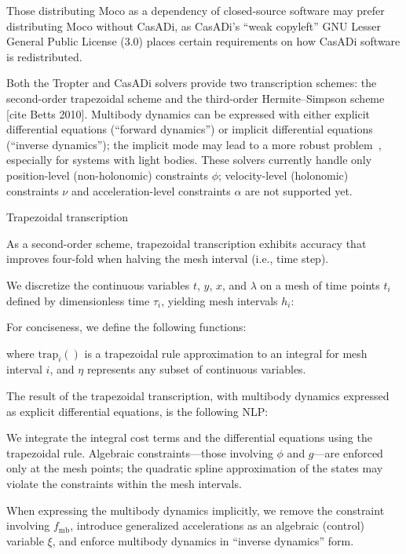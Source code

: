 \documentclass[10pt,letterpaper]{article}
\begin{document}
Those distributing Moco as a dependency of closed-source software may prefer distributing Moco without CasADi, as CasADi’s “weak copyleft” GNU Lesser General Public License (3.0) places certain requirements on how CasADi software is redistributed.

Both the Tropter and CasADi solvers provide two transcription schemes: the second-order trapezoidal scheme and the third-order Hermite–Simpson scheme [cite Betts 2010]. Multibody dynamics can be expressed with either explicit differential equations (“forward dynamics”) or implicit differential equations (“inverse dynamics”); the implicit mode may lead to a more robust problem~\cite{vandenBogert:2011fv}, especially for systems with light bodies. These solvers currently handle only position-level (non-holonomic) constraints $\phi$; velocity-level (holonomic) constraints $\nu$ and acceleration-level constraints $\alpha$ are not supported yet.

Trapezoidal transcription

As a second-order scheme, trapezoidal transcription exhibits accuracy that improves four-fold when halving the mesh interval (i.e., time step).

We discretize the continuous variables $t$, $y$, $x$, and $\lambda$ on a mesh of time points $t_i$ defined by dimensionless time $\tau_i$, yielding mesh intervals $h_i$:



For conciseness, we define the following functions:


where $\mathrm{trap}_i()$ is a trapezoidal rule approximation to an integral for mesh interval $i$, and $\eta$ represents any subset of continuous variables.

The result of the trapezoidal transcription, with multibody dynamics expressed as explicit differential equations, is the following NLP:



We integrate the integral cost terms and the differential equations using the trapezoidal rule. Algebraic constraints—those involving $\phi$ and $g$—are enforced only at the mesh points; the quadratic spline approximation of the states may violate the constraints within the mesh intervals.

When expressing the multibody dynamics implicitly, we remove the constraint involving $f_\mathrm{mb}$, introduce generalized accelerations as an algebraic (control) variable $\xi$, and enforce multibody dynamics in “inverse dynamics” form.
\end{document}
